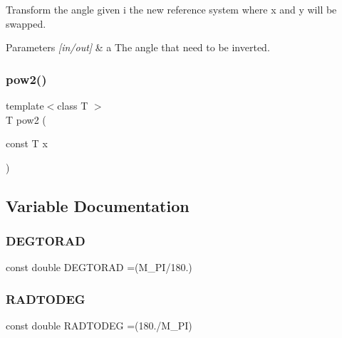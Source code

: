 Transform the angle given i the new reference system where x and y will be swapped. 


\begin{DoxyParams}{Parameters}
{\em \mbox{[}in/out\mbox{]}} & a The angle that need to be inverted. \\
\hline
\end{DoxyParams}
\mbox{\label{maths_8hh_a054f7427a96b10baa550060a0376584c}} 
\subsubsection{\texorpdfstring{pow2()}{pow2()}}
{\footnotesize\ttfamily template$<$class T $>$ \\
T pow2 (\begin{DoxyParamCaption}\item[{const T}]{x }\end{DoxyParamCaption})\hspace{0.3cm}{\ttfamily [inline]}}



\subsection{Variable Documentation}
\mbox{\label{maths_8hh_abe8c019db43eb490b67df53e48a69d28}} 
\subsubsection{\texorpdfstring{DEGTORAD}{DEGTORAD}}
{\footnotesize\ttfamily const double D\+E\+G\+T\+O\+R\+AD =(M\+\_\+\+PI/180.)}

\mbox{\label{maths_8hh_abbe9061bc2ecde6e056b25705a50a829}} 
\subsubsection{\texorpdfstring{RADTODEG}{RADTODEG}}
{\footnotesize\ttfamily const double R\+A\+D\+T\+O\+D\+EG =(180./M\+\_\+\+PI)}

